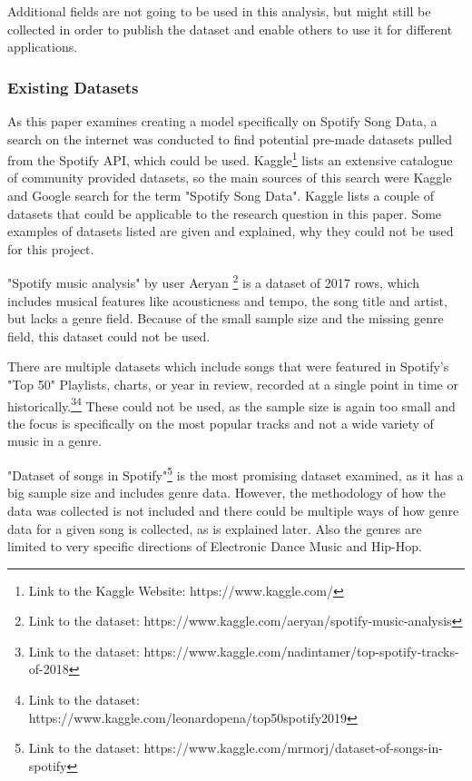 Additional fields are not going to be used in this analysis, but might still be collected in order to
publish the dataset and enable others to use it for different applications.

\subsubsection{Existing Datasets}

As this paper examines creating a model specifically on Spotify Song Data,
a search on the internet was conducted to find potential pre-made datasets
pulled from the Spotify \ac{API}, which could be used.
Kaggle\footnote{Link to the Kaggle Website: https://www.kaggle.com/} lists an extensive
catalogue of community provided datasets, so the main sources of this search were
Kaggle and Google search for the term "Spotify Song Data".
Kaggle lists a couple of datasets that could be applicable to the research question in
this paper. Some examples of datasets listed are given and explained, why they could not 
be used for this project.

"Spotify music analysis" by user Aeryan \footnote{Link to the dataset: https://www.kaggle.com/aeryan/spotify-music-analysis}
is a dataset of 2017 rows, which includes musical features like acousticness and tempo,
the song title and artist, but lacks a genre field. Because of the small sample size
and the missing genre field, this dataset could not be used.

There are multiple datasets which include songs that were featured in Spotify's "Top 50" Playlists,
charts, or year in review, recorded at a single point in time or historically.\footnote{Link to the dataset: https://www.kaggle.com/nadintamer/top-spotify-tracks-of-2018}\footnote{Link to the dataset: https://www.kaggle.com/leonardopena/top50spotify2019}
These could not be used, as the sample size is again too small and the focus is specifically
on the most popular tracks and not a wide variety of music in a genre.

"Dataset of songs in Spotify"\footnote{Link to the dataset: https://www.kaggle.com/mrmorj/dataset-of-songs-in-spotify}
is the most promising dataset examined, as it has a big sample size and includes genre data.
However, the methodology of how the data was collected is not included and there
could be multiple ways of how genre data for a given song is collected, as is explained later.
Also the genres are limited to very specific directions of Electronic Dance Music and Hip-Hop.

